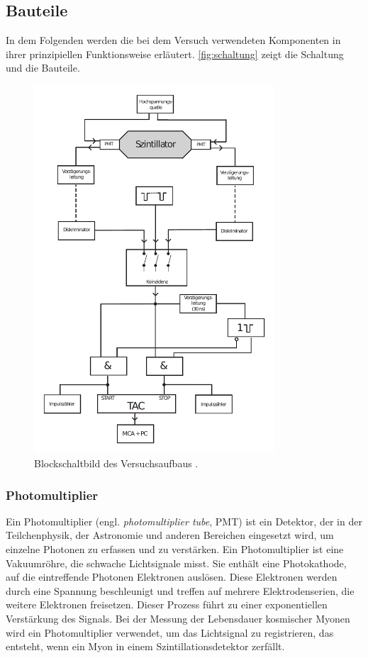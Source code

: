 \subsection*{Bauteile}

In dem Folgenden werden die bei dem Versuch verwendeten Komponenten in ihrer prinzipiellen Funktionsweise erläutert.
\autoref{fig:schaltung} zeigt die Schaltung und die Bauteile.
\begin{figure}
    \centering
    \includegraphics[width=0.8\textwidth]{pictures/schaltung.pdf}
    \caption{Blockschaltbild des Versuchsaufbaus \cite[3]{v01}.}
    \label{fig:schaltung}
\end{figure}


\subsubsection*{Photomultiplier}
Ein Photomultiplier (engl. \textit{photomultiplier tube}, PMT) ist ein Detektor, der in der Teilchenphysik, 
der Astronomie und anderen Bereichen eingesetzt wird, um einzelne Photonen zu erfassen und zu verstärken. 
Ein Photomultiplier ist eine Vakuumröhre, die schwache Lichtsignale misst. 
Sie enthält eine Photokathode, auf die eintreffende Photonen Elektronen auslösen. 
Diese Elektronen werden durch eine Spannung beschleunigt und treffen auf mehrere Elektrodenserien, 
die weitere Elektronen freisetzen. 
Dieser Prozess führt zu einer exponentiellen Verstärkung des Signals.
Bei der Messung der Lebensdauer kosmischer Myonen wird ein Photomultiplier verwendet, 
um das Lichtsignal zu registrieren, das entsteht, 
wenn ein Myon in einem Szintillationsdetektor zerfällt. 

